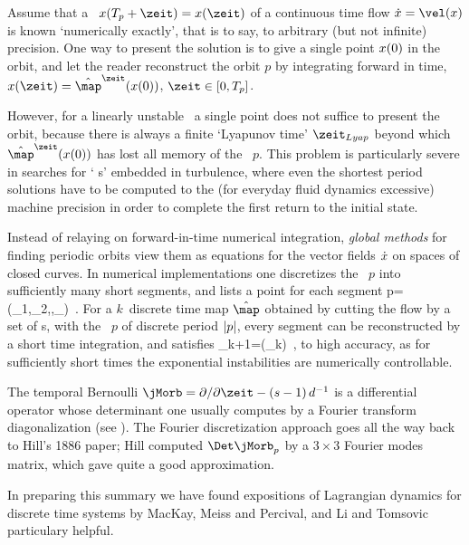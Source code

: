 \bigskip

Assume that a \po\ $\ssp(\period{p}+\zeit)=\ssp(\zeit)$ of a continuous
time flow
\(
\dot{\ssp}=\vel(\ssp)
\)
is known `numerically exactly', that is to say, to arbitrary (but not
infinite) precision. One way to present the solution is to give a single
point $x(0)$ in the orbit, and let the reader reconstruct the orbit
$p$ by integrating forward in time,
$\ssp(\zeit)=\hat{\map}^\zeit(\ssp(0))$, $\zeit\in[0,\period{p}]$.

However, for a linearly unstable \po\ a single point does not suffice to
present the orbit, because there is always a finite `Lyapunov time'
$\zeit_{Lyap}$  beyond which $\hat{\map}^\zeit(\ssp(0))$ has lost all memory of
the \po\ $p$. This problem is particularly severe in searches for {`\ecs
s'} embedded in turbulence, where even the shortest period solutions have
to be computed to the (for everyday fluid dynamics excessive) machine
precision in order to complete the
first return to the initial state.

Instead of relaying on forward-in-time numerical integration,
\emph{global methods} for finding periodic orbits view them
as equations for the vector fields $\dot{x}$ on spaces of closed
curves. In numerical implementations one discretizes the \po\  $p$ into
sufficiently many short
segments, and lists a
point for each segment
\beq
p=(\ssp_1,\ssp_2,\cdots,\ssp_)
\,.
For a $k$\dmn\ discrete time map $\hat{\map}$ obtained by cutting the flow by a
set of {\PoincSec s}, with the \po\ $p$ of discrete period ${|p|}$,
every segment can be reconstructed by a short time integration, and
satisfies
\beq
\ssp_{k+1}=\hat{\map}(\ssp_k)
\,,
to high accuracy, as for sufficiently short times the exponential
instabilities are numerically controllable.


\bigskip

The temporal Bernoulli {\jacobianOrb} %
$\jMorb=\partial/\partial\zeit-(s-1)\,\shift^{-1}$ is a differential
operator whose determinant one usually computes by a Fourier transform
diagonalization (see ). The Fourier discretization
approach goes all the way back to Hill's 1886 paper;
Hill computed $\Det\jMorb_p$ by a $3\times 3$ Fourier modes
matrix, which gave  quite a good approximation.


\bigskip

In preparing this summary we have found expositions of Lagrangian
dynamics for discrete time systems by MacKay, Meiss and
Percival, and Li and Tomsovic particulary
helpful.

